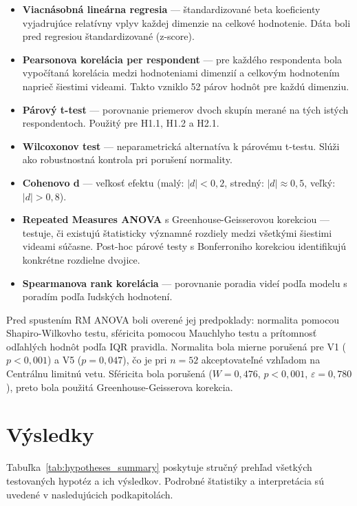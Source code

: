 \begin{itemize}
    \item \textbf{Viacnásobná lineárna regresia} --- štandardizované beta koeficienty vyjadrujúce relatívny vplyv každej dimenzie na celkové hodnotenie. Dáta boli pred regresiou štandardizované (z-score).
    \item \textbf{Pearsonova korelácia per respondent} --- pre každého respondenta bola vypočítaná korelácia medzi hodnoteniami dimenzií a celkovým hodnotením naprieč šiestimi videami. Takto vzniklo 52 párov hodnôt pre každú dimenziu.
    \item \textbf{Párový t-test} --- porovnanie priemerov dvoch skupín merané na tých istých respondentoch\cite{rmAnova}. Použitý pre H1.1, H1.2 a H2.1.
    \item \textbf{Wilcoxonov test} --- neparametrická alternatíva k párovému t-testu\cite{fieldStatistics}. Slúži ako robustnostná kontrola pri porušení normality.
    \item \textbf{Cohenovo d}\cite{cohenD} --- veľkosť efektu (malý: $|d| < 0{,}2$, stredný: $|d| \approx 0{,}5$, veľký: $|d| > 0{,}8$).
    \item \textbf{Repeated Measures ANOVA} s Greenhouse-Geisserovou korekciou\cite{greenhouseGeisser} --- testuje, či existujú štatisticky významné rozdiely medzi všetkými šiestimi videami súčasne. Post-hoc párové testy s Bonferroniho korekciou identifikujú konkrétne rozdielne dvojice.
    \item \textbf{Spearmanova rank korelácia}\cite{spearmanRank} --- porovnanie poradia videí podľa modelu s poradím podľa ľudských hodnotení.
\end{itemize}

Pred spustením RM ANOVA boli overené jej predpoklady: normalita pomocou Shapiro-Wilkovho testu\cite{shapiroWilk}, sféricita pomocou Mauchlyho testu\cite{mauchlySphericity} a prítomnosť odľahlých hodnôt podľa IQR pravidla. Normalita bola mierne porušená pre V1 ($p < 0{,}001$) a V5 ($p = 0{,}047$), čo je pri $n = 52$ akceptovateľné vzhľadom na Centrálnu limitnú vetu\cite{fieldStatistics}. Sféricita bola porušená ($W = 0{,}476$, $p < 0{,}001$, $\varepsilon = 0{,}780$), preto bola použitá Greenhouse-Geisserova korekcia.

\section{Výsledky}

Tabuľka~\ref{tab:hypotheses_summary} poskytuje stručný prehľad všetkých testovaných hypotéz a ich výsledkov. Podrobné štatistiky a interpretácia sú uvedené v nasledujúcich podkapitolách.

